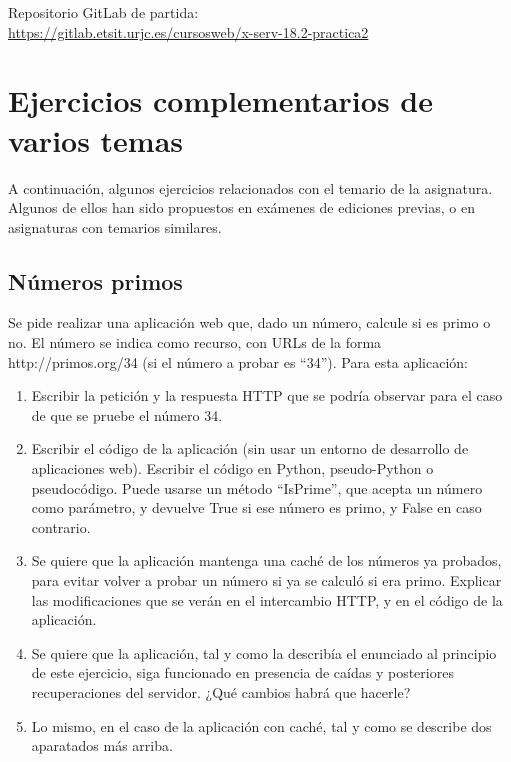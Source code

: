 
Repositorio GitLab de partida: \\
\url{https://gitlab.etsit.urjc.es/cursosweb/x-serv-18.2-practica2}

\newpage



\newpage




\section{Ejercicios complementarios de varios temas}

A continuación, algunos ejercicios relacionados con el temario de la asignatura. Algunos de ellos han sido propuestos en exámenes de ediciones previas, o en asignaturas con temarios similares.

\subsection{Números primos}

Se pide realizar una aplicación web que, dado un número, calcule si es primo o no. El número se indica como recurso, con URLs de la forma http://primos.org/34 (si el número a probar es ``34''). Para esta aplicación:

\begin{enumerate}
\item Escribir la petición y la respuesta HTTP que se podría observar para el caso de que se pruebe el número 34.
\item Escribir el código de la aplicación (sin usar un entorno de desarrollo de aplicaciones web). Escribir el código en Python, pseudo-Python o pseudocódigo. Puede usarse un método ``IsPrime'', que acepta un número como parámetro, y devuelve True si ese número es primo, y False en caso contrario.
\item Se quiere que la aplicación mantenga una caché de los números ya probados, para evitar volver a probar un número si ya se calculó si era primo. Explicar las modificaciones que se verán en el intercambio HTTP, y en el código de la aplicación.
\item Se quiere que la aplicación, tal y como la describía el enunciado al principio de este ejercicio, siga funcionado en presencia de caídas y posteriores recuperaciones del servidor. ¿Qué cambios habrá que hacerle?
\item Lo mismo, en el caso de la aplicación con caché, tal y como se describe dos aparatados más arriba.
\end{enumerate}

